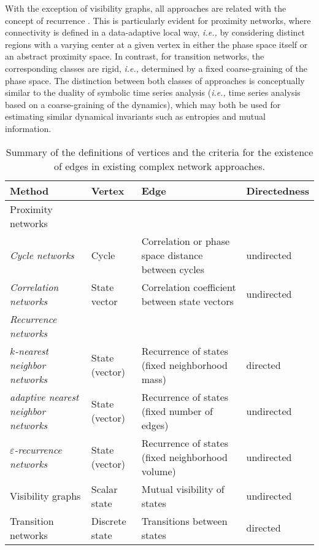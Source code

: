 		With the exception of visibility graphs, all approaches are related with the concept of recurrence \cite{Donner2011}. This is particularly evident for proximity networks, where connectivity is defined in a data-adaptive local way, \textit{i.e.,} by considering distinct regions with a varying center at a given vertex in either the phase space itself or an abstract proximity space. In contrast, for transition networks, the corresponding classes are rigid, \textit{i.e.,} determined by a fixed coarse-graining of the phase space. The distinction between both classes of approaches is conceptually similar to the duality of symbolic time series analysis (\textit{i.e.,} time series analysis based on a coarse-graining of the dynamics), which may both be used for estimating similar dynamical invariants such as entropies and mutual information.
\begin{table}[t]%
\caption{Summary of the definitions of vertices and the criteria for the existence of edges in existing complex network approaches.}{
\small
\begin{tabular}{llll}
\hline
Method & Vertex & Edge & Directedness \\
\hline
Proximity networks & & \\
\textit{Cycle networks} & Cycle & Correlation or phase space distance between cycles & undirected \\
\textit{Correlation networks} & State vector & Correlation coefficient between state vectors & undirected \\
\textit{Recurrence networks} & & & \\
\quad \textit{$k$-nearest neighbor networks}& State (vector) & Recurrence of states (fixed neighborhood mass) & directed \\
\quad \textit{adaptive nearest neighbor networks}& State (vector)  & Recurrence of states (fixed number of edges) & undirected \\
\quad \textit{$\varepsilon$-recurrence networks} & State (vector) & Recurrence of states (fixed neighborhood volume) & undirected \\
\hline
Visibility graphs & Scalar state & Mutual visibility of states & undirected \\
\hline
Transition networks & Discrete state & Transitions between states & directed \\
\hline
\end{tabular}
\normalsize
\label{tab:methods}}
\end{table}

